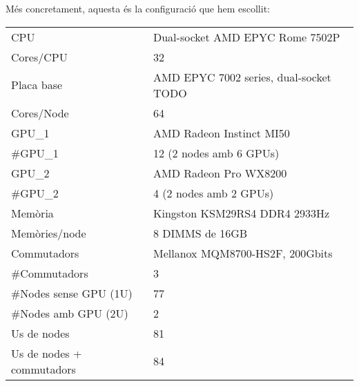 Més concretament, aquesta és la configuració que hem escollit:
\begin{table}[H]
\begin{adjustwidth}{-1.0in}{-1.0in}
\begin{center}
\begin{tabular}{l|l}
\hline
    {\cellcolor[HTML]{EFEFEF}CPU}         & {\cellcolor[HTML]{EFEFEF}Dual-socket AMD EPYC Rome 7502P \cite{cpu_amd_7502_buy}} \\ 
    Cores/CPU & 32 \\
    \rowcolor[HTML]{EFEFEF}
    Placa base & AMD EPYC 7002 series, dual-socket \cite{} TODO \\
Cores/Node                                       & 64                                             \\ 
    {\cellcolor[HTML]{EFEFEF}GPU\_1}                       & {\cellcolor[HTML]{EFEFEF}AMD Radeon Instinct MI50 \cite{gpu_mi50}} \\ 
\#GPU\_1                                           & 12 (2 nodes amb 6 GPUs)                         \\
    {\cellcolor[HTML]{EFEFEF}GPU\_2}                       & {\cellcolor[HTML]{EFEFEF}AMD Radeon Pro WX8200 \cite{gpu_pro_8200}} \\ 
\#GPU\_2                                           & 4 (2 nodes amb 2 GPUs)                         \\
    {\cellcolor[HTML]{EFEFEF}Memòria}     & {\cellcolor[HTML]{EFEFEF}Kingston KSM29RS4 DDR4 2933Hz \cite{mem2}}   \\
{\color[HTML]{000000}Memòries/node}             & {\color[HTML]{000000}8 DIMMS de 16GB}          \\ 
    {\cellcolor[HTML]{EFEFEF}Commutadors} & {\cellcolor[HTML]{EFEFEF}Mellanox MQM8700-HS2F, 200Gbits \cite{mellanox_mqm8700-hs2f}} \\ 
{\color[HTML]{000000}\#Commutadors}             & {\color[HTML]{000000}3}                        \\ 
{\cellcolor[HTML]{EFEFEF}\#Nodes sense GPU (1U)}    & {\cellcolor[HTML]{EFEFEF}77}                       \\
{\color[HTML]{000000}\#Nodes amb GPU (2U)}      & {\color[HTML]{000000}2}                        \\
{\cellcolor[HTML]{EFEFEF}Us de nodes}               & {\cellcolor[HTML]{EFEFEF}81}                       \\
{\color[HTML]{000000}Us de nodes + commutadors} & {\color[HTML]{000000}84}                       \\ \hline

\end{tabular}
\end{center}
\end{adjustwidth}
\end{table}
